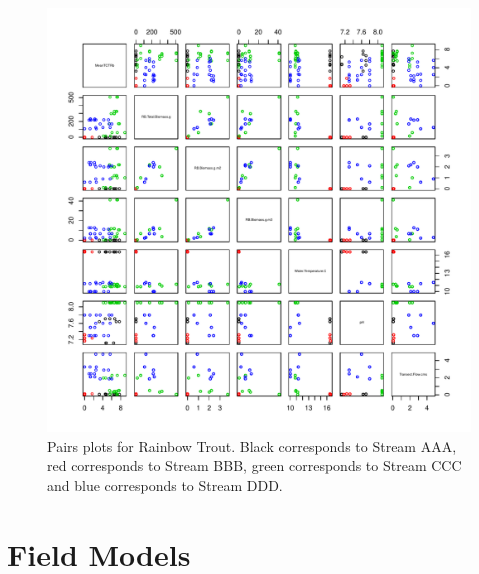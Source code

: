 \begin{figure}[H]
\includegraphics{AppendixImages/Rbpairs.pdf}
\caption{ \hspace{1mm}   Pairs plots for Rainbow Trout. Black corresponds to Stream AAA, red corresponds to Stream BBB, green corresponds to Stream CCC and blue corresponds to Stream DDD.}
\label{fig:pairrb}
\end{figure}



\section{Field Models}



